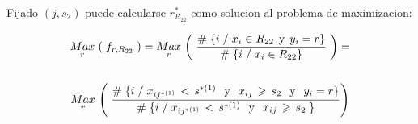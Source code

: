 \documentclass[
  11pt,
  a4paper,
]{article}
\begin{document}
\vspace{0.35cm}

Fijado \((j, s_2)\) puede calcularse \(r_{R_{22}}^*\) como solucion al
problema de maximizacion:

\begin{gather*}
\underset{  r}{ Max} \hspace{0.05 cm} \left(\hspace{0.1 cm} f_{r, R_{22}} \hspace{0.1 cm}\right) = \underset{ r}{ Max} \hspace{0.05 cm} \left(\hspace{0.1 cm}   \dfrac{\# \hspace{0.1 cm}\lbrace i \hspace{0.1 cm}/\hspace{0.1 cm} x_i \in R_{22} \hspace{0.15 cm}\text{y}\hspace{0.15 cm} y_i = r \rbrace}{\# \hspace{0.1 cm}\lbrace i \hspace{0.1 cm}/\hspace{0.1 cm} x_i \in R_{22}  \rbrace}  \hspace{0.1 cm}\right) = \\ \\ \underset{  r}{ Max} \hspace{0.05 cm} \left(\hspace{0.1 cm}   \dfrac{\# \hspace{0.1 cm}\lbrace i \hspace{0.1 cm}/\hspace{0.1 cm}  x_{ij^{*(1)}} \hspace{0.05cm}   < \hspace{0.05cm} s^{*(1)} \hspace{0.25 cm}\text{y}\hspace{0.25 cm} x_{ij} \hspace{0.05cm}   \geqslant \hspace{0.05cm} s_2 \hspace{0.25 cm}\text{y}\hspace{0.25 cm} y_i = r \rbrace}{\# \hspace{0.1 cm}\lbrace i \hspace{0.1 cm} / \hspace{0.1 cm}  x_{ij^{*(1)}} \hspace{0.05cm}   < \hspace{0.05cm} s^{*(1)} \hspace{0.25 cm}\text{y}\hspace{0.25 cm} x_{ij} \hspace{0.05cm}   \geqslant \hspace{0.05cm} s_2  \hspace{0.1 cm} \rbrace } \right)
\end{gather*}
\end{document}
